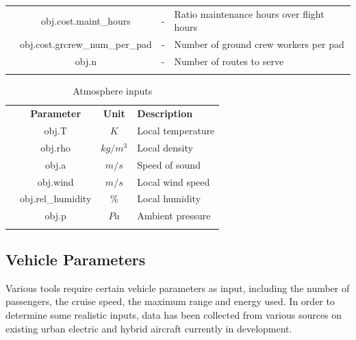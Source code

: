 \begin{table}[H]
\begin{tabular}{|c|c|c|l|}
                       &    obj.cost.maint\_hours     &    -    &   Ratio maintenance hours over flight hours  \\ \cline{2-4}
                       &    obj.cost.grcrew\_num\_per\_pad     &    -    &   Number of ground crew workers per pad  \\ \cline{2-4}
                       &    obj.n     &    -    &   Number of routes to serve  \\ \Xhline{2\arrayrulewidth}
\end{tabular}
\end{table}

\begin{table}[H]
\centering
\caption{Atmosphere inputs}
\label{AtmosphereIn}
\begin{tabular}{|c|c|c|l|}
\Xhline{2\arrayrulewidth}
\multicolumn{1}{|l|}{} & \textbf{Parameter} & \textbf{Unit} & \textbf{Description} \\ \Xhline{2\arrayrulewidth}
\multirow{3}{*}{\rotatebox[origin=c]{90}{{\textbf{Fixed}}}}  
                       &    obj.T     &    $K$    &   Local temperature  \\ \cline{2-4} 
                       &    obj.rho     &    $kg/m^{3}$    &   Local density  \\ \cline{2-4} 
                       &    obj.a     &    $m/s$    &   Speed of sound  \\ \cline{2-4}
                       &    obj.wind     &    $m/s$    &   Local wind speed  \\ \cline{2-4}
                       &    obj.rel\_humidity     &    \%    &   Local humidity  \\ \cline{2-4}
                       &    obj.p     &    $Pa$    &   Ambient pressure  \\ \Xhline{2\arrayrulewidth}
\end{tabular}
\end{table}

\vspace{-1mm}

\subsection{Vehicle Parameters}\label{stats}
Various tools require certain vehicle parameters as input, including the number of passengers, the cruise speed, the maximum range and energy used. In order to determine some realistic inputs, data has been collected from various sources on existing urban electric and hybrid aircraft currently in development.

